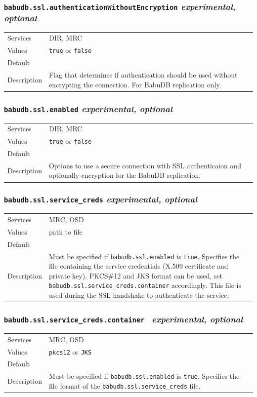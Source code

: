 \documentclass[a4paper,10pt]{book}
\begin{document}
\subsubsection{\texttt{babudb.ssl.authenticationWithoutEncryption} \textit{experimental, optional}}
\begin{tabular}{lp{10cm}}
 Services & DIR, MRC\\
 Values   & \texttt{true} or \texttt{false}\\
 Default  & \\
 Description & Flag that determines if authentication should be used without encrypting the connection. For BabuDB replication only.
\end{tabular}

\subsubsection{\texttt{babudb.ssl.enabled} \textit{experimental, optional}}
\begin{tabular}{lp{10cm}}
 Services & DIR, MRC\\
 Values   & \texttt{true} or \texttt{false}\\
 Default  & \\
 Description & Options to use a secure connection with SSL authenticaion and optionally encryption for the BabuDB replication. 
\end{tabular}

\subsubsection{\texttt{babudb.ssl.service\_creds} \textit{experimental, optional}}
\begin{tabular}{lp{10cm}}
 Services & MRC, OSD\\
 Values   & path to file\\
 Default  & \\
 Description & Must be specified if \texttt{babudb.ssl.enabled} is \texttt{true}. Specifies the file containing the service credentials (X.509 certificate and private key). PKCS\#12 and JKS format can be used, set \texttt{babudb.ssl.service\_creds.container} accordingly. This file is used during the SSL handshake to authenticate the service.
\end{tabular}

\subsubsection{\texttt{babudb.ssl.service\_creds.container } \textit{experimental, optional}}
\begin{tabular}{lp{10cm}}
 Services & MRC, OSD\\
 Values   & \texttt{pkcs12} or \texttt{JKS}\\
 Default  & \\
 Description & Must be specified if \texttt{babudb.ssl.enabled} is \texttt{true}. Specifies the file format of the \texttt{babudb.ssl.service\_creds} file.
\end{tabular}
\end{document}
